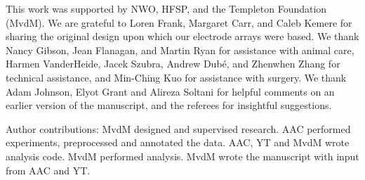 \documentclass[11pt]{article}
\begin{document}
This work was supported by NWO, HFSP, and the Templeton Foundation
(MvdM). We are grateful to Loren Frank, Margaret Carr, and Caleb
Kemere for sharing the original design upon which our electrode arrays
were based. We thank Nancy Gibson, Jean Flanagan, and Martin Ryan for
assistance with animal care, Harmen VanderHeide, Jacek Szubra, Andrew
Dub\'e, and Zhenwhen Zhang for technical assistance, and Min-Ching Kuo
for assistance with surgery. We thank Adam Johnson, Elyot Grant and
Alireza Soltani for helpful comments on an earlier version of the
manuscript, and the referees for insightful suggestions.

Author contributions: MvdM designed and supervised research. AAC
performed experiments, preprocessed and annotated the data. AAC, YT
and MvdM wrote analysis code. MvdM performed analysis. MvdM wrote the
manuscript with input from AAC and YT.


\end{document}
